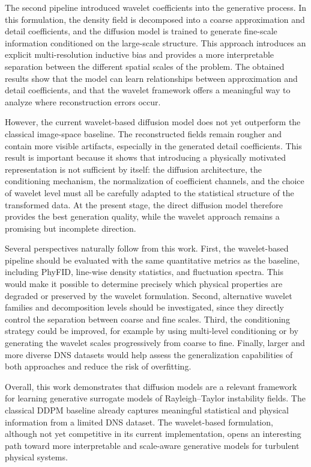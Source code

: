 The second pipeline introduced wavelet coefficients into the generative
process. In this formulation, the density field is decomposed into a coarse
approximation and detail coefficients, and the diffusion model is trained to
generate fine-scale information conditioned on the large-scale structure. This
approach introduces an explicit multi-resolution inductive bias and provides a
more interpretable separation between the different spatial scales of the
problem. The obtained results show that the model can learn relationships
between approximation and detail coefficients, and that the wavelet framework
offers a meaningful way to analyze where reconstruction errors occur.

However, the current wavelet-based diffusion model does not yet outperform the
classical image-space baseline. The reconstructed fields remain rougher and
contain more visible artifacts, especially in the generated detail
coefficients. This result is important because it shows that introducing a
physically motivated representation is not sufficient by itself: the diffusion
architecture, the conditioning mechanism, the normalization of coefficient
channels, and the choice of wavelet level must all be carefully adapted to the
statistical structure of the transformed data. At the present stage, the direct
diffusion model therefore provides the best generation quality, while the
wavelet approach remains a promising but incomplete direction.

Several perspectives naturally follow from this work. First, the wavelet-based
pipeline should be evaluated with the same quantitative metrics as the
baseline, including PhyFID, line-wise density statistics, and fluctuation
spectra. This would make it possible to determine precisely which physical
properties are degraded or preserved by the wavelet formulation. Second,
alternative wavelet families and decomposition levels should be investigated,
since they directly control the separation between coarse and fine scales.
Third, the conditioning strategy could be improved, for example by using
multi-level conditioning or by generating the wavelet scales progressively from
coarse to fine. Finally, larger and more diverse DNS datasets would help assess
the generalization capabilities of both approaches and reduce the risk of
overfitting.

Overall, this work demonstrates that diffusion models are a relevant framework
for learning generative surrogate models of Rayleigh--Taylor instability
fields. The classical DDPM baseline already captures meaningful statistical and
physical information from a limited DNS dataset. The wavelet-based formulation,
although not yet competitive in its current implementation, opens an
interesting path toward more interpretable and scale-aware generative models
for turbulent physical systems.

